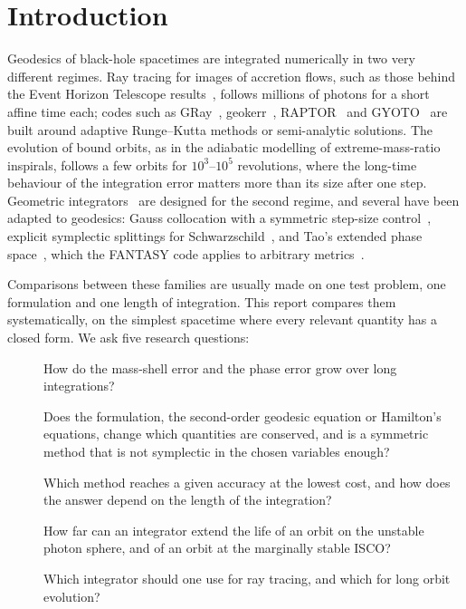 \section{Introduction}
\label{sec:introduction}

Geodesics of black-hole spacetimes are integrated numerically in two very different regimes.
Ray tracing for images of accretion flows, such as those behind the Event Horizon Telescope
results~\cite{eht2019}, follows millions of photons for a short affine time each; codes such
as GRay~\cite{chan2013}, geokerr~\cite{dexter2009}, RAPTOR~\cite{bronzwaer2018} and
GYOTO~\cite{vincent2011} are built around adaptive Runge--Kutta methods or semi-analytic
solutions. The evolution of bound orbits, as in the adiabatic modelling of
extreme-mass-ratio inspirals, follows a few orbits for $10^3$--$10^5$ revolutions, where the
long-time behaviour of the integration error matters more than its size after one step.
Geometric integrators~\cite{gni2006} are designed for the second regime, and several have been
adapted to geodesics: Gauss collocation with a symmetric step-size control~\cite{seyrich2012},
explicit symplectic splittings for Schwarzschild~\cite{wang2021}, and Tao's extended phase
space~\cite{tao2016,pihajoki2015}, which the FANTASY code applies to arbitrary
metrics~\cite{christian2021}.

Comparisons between these families are usually made on one test problem, one formulation and
one length of integration. This report compares them systematically, on the simplest
spacetime where every relevant quantity has a closed form. We ask five research questions:

\begin{description}
\item[] How do the mass-shell error and the phase error grow over long integrations?
\item[] Does the formulation, the second-order geodesic equation or Hamilton's
  equations, change which quantities are conserved, and is a symmetric method that is not
  symplectic in the chosen variables enough?
\item[] Which method reaches a given accuracy at the lowest cost, and how does the answer
  depend on the length of the integration?
\item[] How far can an integrator extend the life of an orbit on the unstable photon
  sphere, and of an orbit at the marginally stable ISCO?
\item[] Which integrator should one use for ray tracing, and which for long orbit
  evolution?
\end{description}


